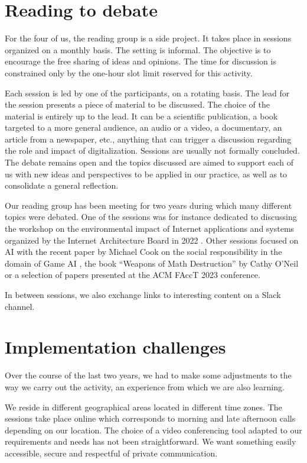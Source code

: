 \documentclass[journal]{IEEEtran}
\begin{document}
\section{Reading to debate}

For the  four of  us, the reading  group is a  side project.  It takes
place  in  sessions organized  on  a  monthly  basis. The  setting  is
informal. The objective is to encourage  the free sharing of ideas and
opinions. The time for discussion  is constrained only by the one-hour
slot limit reserved for this activity.

Each  session  is led  by  one  of  the  participants, on  a  rotating
basis. The  lead for the  session presents a  piece of material  to be
discussed. The choice  of the material is entirely up  to the lead. It
can be  a scientific publication,  a book  targeted to a  more general
audience,  an audio  or  a video,  a documentary,  an  article from  a
newspaper, etc., anything that can  trigger a discussion regarding the
role and impact  of digitalization. Sessions are  usually not formally
concluded. The debate remains open  and the topics discussed are aimed
to support each of us with new ideas and perspectives to be applied in
our practice, as well as to consolidate a general reflection.

Our reading  group has been  meeting for  two years during  which many
different topics  were debated. One  of the sessions was  for instance
dedicated to  discussing the workshop  on the environmental  impact of
Internet   applications  and   systems  organized   by  the   Internet
Architecture Board in 2022 \cite{IAB22}.  Other sessions focused on AI
with the recent paper by Michael  Cook on the social responsibility in
the  domain  of Game  AI  \cite{Cook21},  the  book “Weapons  of  Math
Destruction” by  Cathy O’Neil  \cite{WMD16} or  a selection  of papers
presented at the ACM FAccT 2023 conference.

In between sessions, we also  exchange links to interesting content on
a Slack channel.

\section{Implementation challenges}

Over the course of the last two years, we had to make some adjustments
to the way we carry out the  activity, an experience from which we are
also learning.

We reside  in different geographical  areas located in  different time
zones. The sessions take place online which corresponds to morning and
late afternoon calls depending on our  location. The choice of a video
conferencing tool adapted  to our requirements and needs  has not been
straightforward.   We want  something  easily  accessible, secure  and
respectful of private communication.
\end{document}
